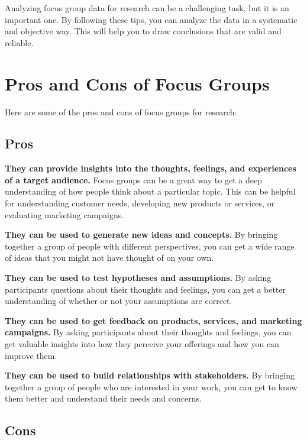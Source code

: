 \documentclass[
  b5paper]{book}
\begin{document}
Analyzing focus group data for research can be a challenging task, but it is an important one. By following these tips, you can analyze the data in a systematic and objective way. This will help you to draw conclusions that are valid and reliable.

\hypertarget{pros-and-cons-of-focus-groups}{%
\section{Pros and Cons of Focus Groups}\label{pros-and-cons-of-focus-groups}}

Here are some of the pros and cons of focus groups for research:

\hypertarget{pros}{%
\subsection*{Pros}\label{pros}}

\textbf{They can provide insights into the thoughts, feelings, and experiences of a target audience.} Focus groups can be a great way to get a deep understanding of how people think about a particular topic. This can be helpful for understanding customer needs, developing new products or services, or evaluating marketing campaigns.

\textbf{They can be used to generate new ideas and concepts.} By bringing together a group of people with different perspectives, you can get a wide range of ideas that you might not have thought of on your own.

\textbf{They can be used to test hypotheses and assumptions.} By asking participants questions about their thoughts and feelings, you can get a better understanding of whether or not your assumptions are correct.

\textbf{They can be used to get feedback on products, services, and marketing campaigns.} By asking participants about their thoughts and feelings, you can get valuable insights into how they perceive your offerings and how you can improve them.

\textbf{They can be used to build relationships with stakeholders.} By bringing together a group of people who are interested in your work, you can get to know them better and understand their needs and concerns.

\hypertarget{cons}{%
\subsection*{Cons}\label{cons}}
\end{document}

